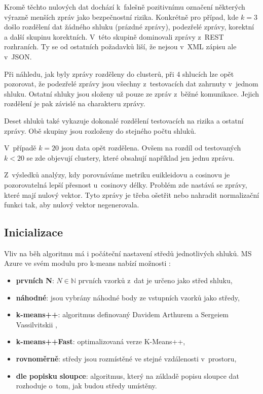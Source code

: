 \documentclass[thesis=M,czech]{FITthesis}[2012/10/20]
\begin{document}
			Kromě těchto nulových dat dochází k~falešně pozitivnímu označení některých výrazně menších zpráv jako bezpečnostní rizika. Konkrétně pro případ, kde $k = 3$ došlo rozdělení dat žádného shluku (prázdné zprávy), podezřelé zprávy, korektní a další skupinu korektních. V~této skupině dominovali zprávy z~REST rozhraních. Ty se od ostatních požadavků liší, že nejsou v~XML zápisu ale v~JSON.
			
			Při náhledu, jak byly zprávy rozděleny do clusterů, při 4 shlucích lze opět pozorovat, že podezřelé zprávy jsou všechny z~testovacích dat zahrnuty v~jednom shluku. Ostatní shluky jsou složeny už pouze ze zpráv z~běžné komunikace. Jejich rozdělení je pak závislé na charakteru zprávy.
			
			Deset shluků také vykazuje dokonalé rozdělení testovacích na rizika a ostatní zprávy. Obě skupiny jsou rozloženy do stejného počtu shluků.
			
			V~případě $ k = 20$ jsou data opět rozdělena. Ovšem na rozdíl od testovaných $k < 20$ se zde objevují clustery, které obsahují například jen jednu zprávu. 
			
			Z~výsledků analýzy, kdy porovnáváme metriku euikleidovu a cosinovu je pozorovatelná lepší přesnost u~cosinovy délky. Problém zde nastává se zprávy, které mají nulový vektor. Tyto zprávy je třeba ošetřit nebo nahradit normalizační funkci tak, aby nulový vektor negenerovala. 			
			
		\subsection{Inicializace}
			Vliv na běh algoritmu má i počáteční nastavení středů jednotlivých shluků. MS Azure ve svém modulu pro k-means nabízí možnosti \cite{MSAzure-kmeans}:
			
			\begin{itemize} 
				\item \textbf{prvních N}: $N \in \mathbb{N} $ prvních vzorků z~dat je určeno jako střed shluku, 
				\item \textbf{náhodné}: jsou vybrány náhodné body ze vstupních vzorků jako středy,
				\item \textbf{k-means++}: algoritmus definovaný Davidem Arthurem a Sergeiem Vassilvitskii \cite{kmeans++},
				\item \textbf{k-means++Fast}: optimalizovaná verze K-Means++,	
				\item \textbf{rovnoměrně}: středy jsou rozmístěné ve stejné vzdálenosti v~prostoru,		
				\item \textbf{dle popisku sloupce}: algoritmus, který na základě popisu sloupce dat rozhoduje o~tom, jak budou středy umístěny.			
			\end{itemize}
		
\end{document}
